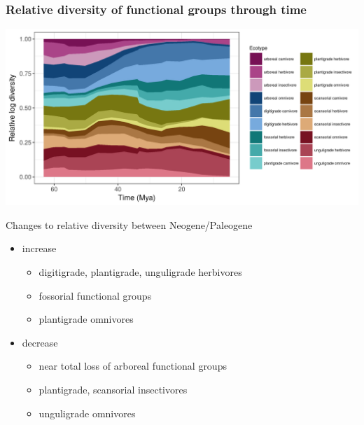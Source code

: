 \documentclass{beamer}
\begin{document}
\begin{frame}
  \frametitle{Relative diversity of functional groups through time}
  \begin{center}
    \includegraphics[height=0.9\textheight,width=\textwidth,keepaspectratio=true]{figure/relative_diversity}
  \end{center}
\end{frame}


\begin{frame}
  \begin{block}{Changes to relative diversity between Neogene/Paleogene}
    \begin{itemize}
      \item \alert{increase}
        \begin{itemize}
          \item digitigrade, plantigrade, unguligrade herbivores
          \item fossorial functional groups
          \item plantigrade omnivores
        \end{itemize}
      \item \alert{decrease}
        \begin{itemize}
          \item near total loss of arboreal functional groups
          \item plantigrade, scansorial insectivores
          \item unguligrade omnivores
        \end{itemize}
    \end{itemize}
  \end{block}
\end{frame}
\end{document}
